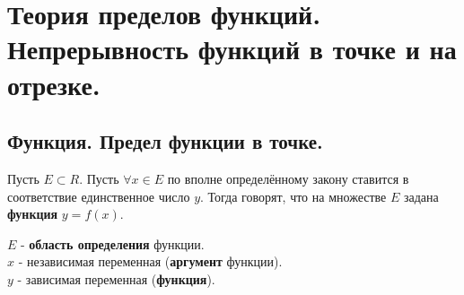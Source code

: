 \documentclass[12pt]{article}
\begin{document}
    \section{Теория пределов функций. Непрерывность функций в точке и на отрезке.}
    \subsection{Функция. Предел функции в точке.}
    \noindent Пусть $E \subset R$. Пусть $\forall x \in E$ по вполне определённому закону ставится в соответствие единственное число $y$. Тогда говорят, что на множестве $E$ задана \textbf{функция} $y = f(x)$.\par\noindent
    $E$ - \textbf{область определения} функции.\\
    $x$ - независимая переменная (\textbf{аргумент} функции).\\
    $y$ - зависимая переменная (\textbf{функция}).
\end{document}
